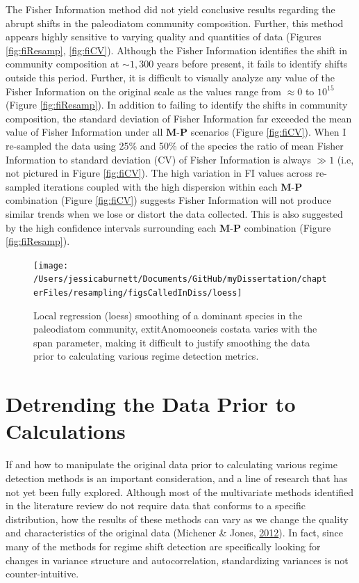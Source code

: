 \documentclass[12pt,twoside,openany]{reedthesis}
\begin{document}
The Fisher Information method did not yield conclusive results regarding the abrupt shifts in the paleodiatom community composition. Further, this method appears highly sensitive to varying quality and quantities of data (Figures \ref{fig:fiResamp}, \ref{fig:fiCV}). Although the Fisher Information identifies the shift in community composition at \(\sim1,300\) years before present, it fails to identify shifts outside this period. Further, it is difficult to visually analyze any value of the Fisher Information on the original scale as the values range from \(\approx 0\) to \(10^{15}\) (Figure \ref{fig:fiResamp}). In addition to failing to identify the shifts in community composition, the standard deviation of Fisher Information far exceeded the mean value of Fisher Information under all \(\textbf{M}\)-\(\textbf{P}\) scenarios (Figure \ref{fig:fiCV}). When I re-sampled the data using 25\% and 50\% of the species the ratio of mean Fisher Information to standard deviation (CV) of Fisher Information is always \(\gg 1\) (i.e, not pictured in Figure \ref{fig:fiCV}). The high variation in FI values across re-sampled iterations coupled with the high dispersion within each \(\textbf{M}\)-\(\textbf{P}\) combination (Figure \ref{fig:fiCV}) suggests Fisher Information will not produce similar trends when we lose or distort the data collected. This is also suggested by the high confidence intervals surrounding each \(\textbf{M}\)-\(\textbf{P}\) combination (Figure \ref{fig:fiResamp}).
\begin{figure}
\texttt{[image: /Users/jessicaburnett/Documents/GitHub/myDissertation/chapterFiles/resampling/figsCalledInDiss/loess]} \caption{Local regression (loess) smoothing of a dominant species in the paleodiatom community,    extit{Anomoeoneis costata} varies with the span parameter, making it difficult to justify smoothing the data prior to calculating various regime detection metrics.}\label{fig:loessEx}
\end{figure}
\hypertarget{detrending-the-data-prior-to-calculations}{%
\section{Detrending the Data Prior to Calculations}\label{detrending-the-data-prior-to-calculations}}

If and how to manipulate the original data prior to calculating various regime detection methods is an important consideration, and a line of research that has not yet been fully explored. Although most of the multivariate methods identified in the literature review do not require data that conforms to a specific distribution, how the results of these methods can vary as we change the quality and characteristics of the original data (Michener \& Jones, \protect\hyperlink{ref-michener2012ecoinformatics}{2012}). In fact, since many of the methods for regime shift detection are specifically looking for changes in variance structure and autocorrelation, standardizing variances is not counter-intuitive.
\end{document}
